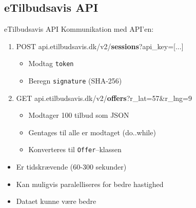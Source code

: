 		\subsection{eTilbudsavis API}
			\begin{frame}[t]{eTilbudsavis API}
			Kommunikation med API'en:
				\begin{enumerate}
					\item<1> POST api.etilbudsavis.dk/v2/\textbf{sessions}?api\_key=[...]
					\begin{itemize}
						\item<1> Modtag \texttt{token}
						\item<1> Beregn \texttt{signature} (SHA-256)
					\end{itemize}
					\item<2> GET api.etilbudsavis.dk/v2/\textbf{offers}?r\_lat=57\&r\_lng=9
					\begin{itemize}
						\item<2> Modtager 100 tilbud som JSON
						\item<2> Gentages til alle er modtaget (do..while)
						\item<2> Konverteres til \texttt{Offer}--klassen
					\end{itemize}
				\end{enumerate}
				\begin{itemize}
					\item<3> Er tidskrævende (60-300 sekunder)
					\item<3> Kan muligvis paralelliseres for bedre hastighed
					\item<3> Dataet kunne være bedre
				\end{itemize}
			\end{frame}